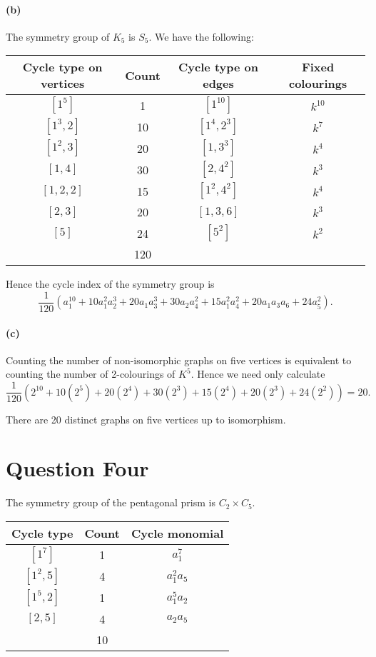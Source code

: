 \paragraph{(b)}
The symmetry group of $ K_5 $ is $ S_5 $. We have the following:
\begin{center}\begin{tabular}{|c|c|c|c|}\hline
  \textbf{Cycle type on vertices} & \textbf{Count} & \textbf{Cycle type on edges} &\textbf{Fixed colourings}\\\hline
  $ [1^5] $ & 1 & $ [1^{10}] $ & $ k^{10} $\\
  $ [1^3,2] $ & 10 & $ [1^4,2^3] $ & $ k^7 $\\
  $ [1^2,3] $ & 20 & $ [1,3^3] $ & $ k^4 $\\
  $ [1, 4] $ & 30 & $ [2,4^2] $ & $ k^3 $\\
  $ [1,2,2] $ & 15 & $ [1^2,4^2] $ & $ k^4 $\\
  $ [2,3] $ & 20 & $ [1,3,6] $ & $ k^3 $\\
  $ [5] $ & 24 & $ [5^2] $ & $ k^2 $\\\hline
  & 120 &&\\\hline
\end{tabular}\end{center}

Hence the cycle index of the symmetry group is
\begin{displaymath}
  \frac{1}{120}(a_1^{10} + 10a_1^2 a_2^3 + 20a_1 a_3^3 + 30a_2 a_4^2 + 15a_1^2 a_4^2 + 20 a_1 a_3 a_6 + 24a_5^2).
\end{displaymath}

\paragraph{(c)}
Counting the number of non-isomorphic graphs on five vertices is equivalent to counting the number of 2-colourings of $ K^5 $.
Hence we need only calculate
\begin{displaymath}
  \frac{1}{120}(2^{10} + 10(2^5) + 20(2^4) + 30(2^3) + 15(2^4) + 20(2^3) + 24(2^2)) = 20.
\end{displaymath}

There are 20 distinct graphs on five vertices up to isomorphism.

\section*{Question Four}
The symmetry group of the pentagonal prism is $ C_2 \times C_5 $.
\begin{center}\begin{tabular}{|c|c|c|}\hline
  \textbf{Cycle type} & \textbf{Count} & \textbf{Cycle monomial}\\\hline
  $ [1^7] $ & 1 & $ a_1^7 $\\
  $ [1^2,5] $ & 4 & $ a_1^2 a_5 $\\
  $ [1^5,2] $ & 1 & $ a_1^5 a_2 $\\
  $ [2,5] $ & 4 & $ a_2 a_5 $\\\hline
   & 10 &\\\hline
\end{tabular}\end{center}

